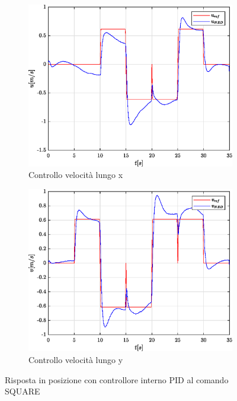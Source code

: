 \begin{figure}
\begin{subfigure}{0.45\textwidth}
		\label{fig:SQUAREerrposyPID}
	\end{subfigure}
	\\
	\begin{subfigure}{0.45\textwidth}
		\centering
		\includegraphics[width=1\textwidth]{Simulazioni/Figure/PID/SQUARE/PositionControlXVel}
		\caption{Controllo velocità lungo x}
		\label{fig:SQUAREerrvelxPID}
	\end{subfigure}
	\hfill
	\begin{subfigure}{0.45\textwidth}
		\centering
		\includegraphics[width=1\textwidth]{Simulazioni/Figure/PID/SQUARE/PositionControlYVel}
		\caption{Controllo velocità lungo y}
		\label{fig:SQUAREerrvelyPID}
	\end{subfigure}
	\caption{Risposta in posizione con controllore interno PID al comando SQUARE}
\end{figure}


